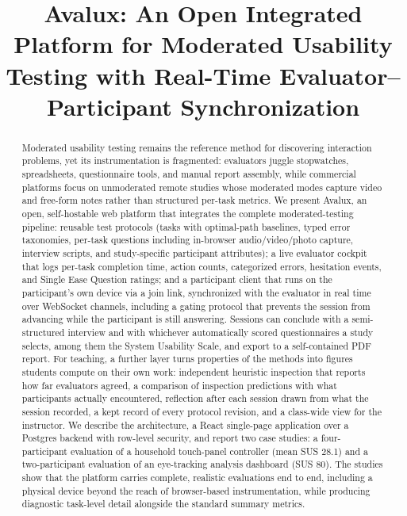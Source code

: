 \documentclass[conference]{IEEEtran}
\begin{document}
\title{Avalux: An Open Integrated Platform for Moderated Usability Testing
with Real-Time Evaluator--Participant Synchronization}

\author{
}

\maketitle

\begin{abstract}
Moderated usability testing remains the reference method for discovering
interaction problems, yet its instrumentation is fragmented: evaluators
juggle stopwatches, spreadsheets, questionnaire tools, and manual report
assembly, while commercial platforms focus on unmoderated remote studies
whose moderated modes capture video and free-form notes rather than
structured per-task metrics. We present
Avalux, an open, self-hostable web platform that integrates the complete
moderated-testing pipeline: reusable test protocols (tasks with optimal-path
baselines, typed error taxonomies, per-task questions including in-browser
audio/video/photo capture, interview scripts, and study-specific participant
attributes); a live evaluator cockpit that logs per-task completion time,
action counts, categorized errors, hesitation events, and Single Ease
Question ratings; and a participant client that runs on the participant's
own device via a join link, synchronized with the evaluator in real time
over WebSocket channels, including a gating protocol that prevents the
session from advancing while the participant is still answering. Sessions
can conclude with a semi-structured interview and with whichever
automatically scored questionnaires a study selects, among them the System
Usability Scale, and export to a self-contained PDF report.
For teaching, a further layer turns properties of the methods into figures
students compute on their own work: independent heuristic inspection that
reports how far evaluators agreed, a comparison of inspection predictions
with what participants actually encountered, reflection after each session
drawn from what the session recorded, a kept record of every protocol
revision, and a class-wide view for the instructor.
We describe the architecture, a React single-page application over a
Postgres backend with row-level security, and report two case studies:
a four-participant evaluation of a household touch-panel controller
(mean SUS 28.1) and a two-participant evaluation of an eye-tracking
analysis dashboard (SUS 80). The studies show that the platform
carries complete, realistic evaluations end to end, including a physical
device beyond the reach of browser-based instrumentation, while
producing diagnostic task-level detail alongside the standard summary
metrics.
\end{abstract}
\end{document}
